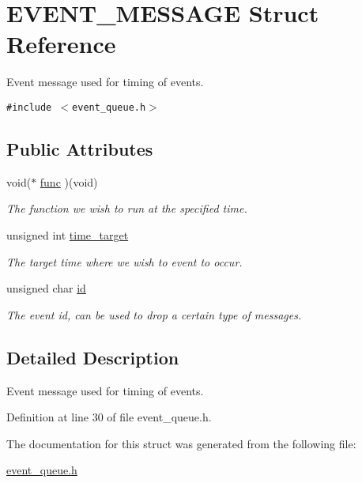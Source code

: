 \hypertarget{structEVENT__MESSAGE}{
\section{EVENT\_\-MESSAGE Struct Reference}
\label{structEVENT__MESSAGE}
}
Event message used for timing of events.  


{\tt \#include $<$event\_\-queue.h$>$}

\subsection*{Public Attributes}
\begin{CompactItemize}
\item 
\hypertarget{structEVENT__MESSAGE_8943c5cf8d01720bc2675e5353769fa7}{
void($\ast$ \hyperlink{structEVENT__MESSAGE_8943c5cf8d01720bc2675e5353769fa7}{func} )(void)}
\label{structEVENT__MESSAGE_8943c5cf8d01720bc2675e5353769fa7}

\begin{CompactList}\small\item\em The function we wish to run at the specified time. \item\end{CompactList}\item 
\hypertarget{structEVENT__MESSAGE_95dfb5df916b9010f6619b1759d5187d}{
unsigned int \hyperlink{structEVENT__MESSAGE_95dfb5df916b9010f6619b1759d5187d}{time\_\-target}}
\label{structEVENT__MESSAGE_95dfb5df916b9010f6619b1759d5187d}

\begin{CompactList}\small\item\em The target time where we wish to event to occur. \item\end{CompactList}\item 
\hypertarget{structEVENT__MESSAGE_c5b5470e3bc22e262b1621e997a30941}{
unsigned char \hyperlink{structEVENT__MESSAGE_c5b5470e3bc22e262b1621e997a30941}{id}}
\label{structEVENT__MESSAGE_c5b5470e3bc22e262b1621e997a30941}

\begin{CompactList}\small\item\em The event id, can be used to drop a certain type of messages. \item\end{CompactList}\end{CompactItemize}


\subsection{Detailed Description}
Event message used for timing of events. 

Definition at line 30 of file event\_\-queue.h.

The documentation for this struct was generated from the following file:\begin{CompactItemize}
\item 
\hyperlink{event__queue_8h}{event\_\-queue.h}\end{CompactItemize}
